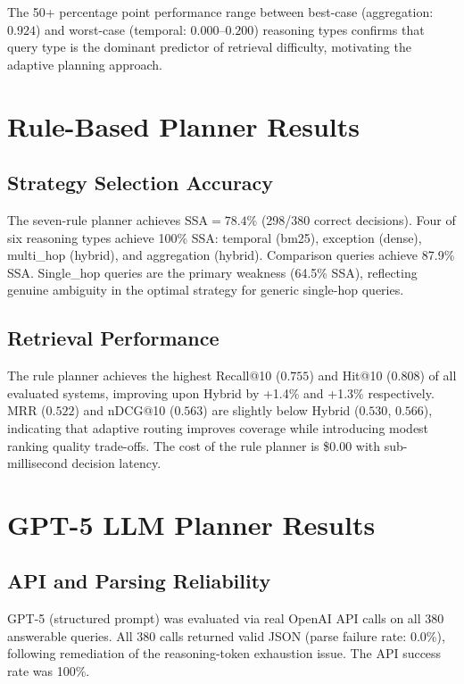 The 50+ percentage point performance range between best-case (aggregation: $0.924$) and worst-case (temporal: $0.000$--$0.200$) reasoning types confirms that query type is the dominant predictor of retrieval difficulty, motivating the adaptive planning approach.

\FloatBarrier
\section{Rule-Based Planner Results}
\label{sec:results_rule}

\subsection{Strategy Selection Accuracy}

The seven-rule planner achieves SSA$={78.4\%}$ (298/380 correct decisions). Four of six reasoning types achieve 100\% SSA: temporal (bm25), exception (dense), multi\_hop (hybrid), and aggregation (hybrid). Comparison queries achieve 87.9\% SSA. Single\_hop queries are the primary weakness (64.5\% SSA), reflecting genuine ambiguity in the optimal strategy for generic single-hop queries.

\subsection{Retrieval Performance}

The rule planner achieves the highest Recall@10 ($0.755$) and Hit@10 ($0.808$) of all evaluated systems, improving upon Hybrid by +1.4\% and +1.3\% respectively. MRR ($0.522$) and nDCG@10 ($0.563$) are slightly below Hybrid ($0.530$, $0.566$), indicating that adaptive routing improves coverage while introducing modest ranking quality trade-offs. The cost of the rule planner is \$0.00 with sub-millisecond decision latency.

\FloatBarrier
\section{GPT-5 LLM Planner Results}
\label{sec:results_gpt5}

\subsection{API and Parsing Reliability}

GPT-5 (structured prompt) was evaluated via real OpenAI API calls on all 380 answerable queries. All 380 calls returned valid JSON (parse failure rate: 0.0\%), following remediation of the reasoning-token exhaustion issue. The API success rate was 100\%.

